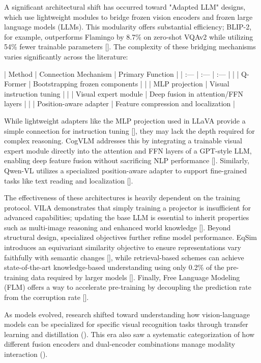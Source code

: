 \documentclass[11pt]{article}
\begin{document}
A significant architectural shift has occurred toward "Adapted LLM" designs, which use lightweight modules to bridge frozen vision encoders and frozen large language models (LLMs). This modularity offers substantial efficiency; BLIP-2, for example, outperforms Flamingo by 8.7\% on zero-shot VQAv2 while utilizing 54\% fewer trainable parameters [\citep{2301.12597}]. The complexity of these bridging mechanisms varies significantly across the literature:

| Method | Connection Mechanism | Primary Function |
| :--- | :--- | :--- |
| \citep{2301.12597} | Q-Former | Bootstrapping frozen components |
| \citep{2304.08485} | MLP projection | Visual instruction tuning |
| \citep{2311.03079} | Visual expert module | Deep fusion in attention/FFN layers |
| \citep{2308.12966} | Position-aware adapter | Feature compression and localization |

While lightweight adapters like the MLP projection used in LLaVA provide a simple connection for instruction tuning [\citep{2304.08485}], they may lack the depth required for complex reasoning. CogVLM addresses this by integrating a trainable visual expert module directly into the attention and FFN layers of a GPT-style LLM, enabling deep feature fusion without sacrificing NLP performance [\citep{2311.03079}]. Similarly, Qwen-VL utilizes a specialized position-aware adapter to support fine-grained tasks like text reading and localization [\citep{2308.12966}].

The effectiveness of these architectures is heavily dependent on the training protocol. VILA demonstrates that simply training a projector is insufficient for advanced capabilities; updating the base LLM is essential to inherit properties such as multi-image reasoning and enhanced world knowledge [\citep{2312.07533}]. Beyond structural design, specialized objectives further refine model performance. EqSim introduces an equivariant similarity objective to ensure representations vary faithfully with semantic changes [\citep{2303.14465}], while retrieval-based schemes can achieve state-of-the-art knowledge-based understanding using only 0.2\% of the pre-training data required by larger models [\citep{2304.13923}]. Finally, Free Language Modeling (FLM) offers a way to accelerate pre-training by decoupling the prediction rate from the corruption rate [\citep{2303.14038}].

As models evolved, research shifted toward understanding how vision-language models can be specialized for specific visual recognition tasks through transfer learning and distillation (\citep{2304.00685}). This era also saw a systematic categorization of how different fusion encoders and dual-encoder combinations manage modality interaction (\citep{2202.10936}).
\end{document}
